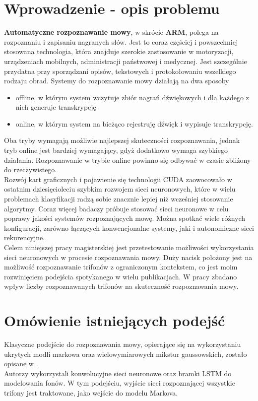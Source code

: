 \documentclass[11pt]{article}
\begin{document}
\section{Wprowadzenie - opis problemu}
	\textbf{Automatyczne rozpoznawanie mowy}, w skrócie \textbf{ARM}, polega na rozpoznaniu i zapisaniu nagranych słów. Jest to coraz częściej i powszechniej stosowana technologia, która znajduje szerokie zastosowanie w motoryzacji, urządzeniach mobilnych, administracji państwowej i medycznej. Jest szczególnie przydatna przy sporządzani opisów, tekstowych i protokołowaniu wszelkiego rodzaju obrad. Systemy do rozpoznawanie mowy działają na dwa sposoby
	\begin{itemize}
		\item offline, w którym system wczytuje zbiór nagrań dźwiękowych i dla każdego z nich generuje transkrypcję
		\item online, w którym system na bieżąco rejestruję dźwięk i wypisuje transkrypcję.
	\end{itemize}
	Oba tryby wymagają możliwie najlepszej skuteczności rozpoznawania, jednak tryb online jest bardziej wymagający, gdyż dodatkowo wymaga szybkiego działania. Rozpoznawanie w trybie online powinno się odbywać w czasie zbliżony do rzeczywistego. 
	\\
	Rozwój kart graficznych i pojawienie się technologii CUDA zaowocowało w ostatnim dziesięcioleciu szybkim rozwojem sieci neuronowych, które w wielu problemach klasyfikacji radzą sobie znacznie lepiej niż wcześniej stosowanie algorytmy. Coraz więcej badaczy próbuje stosować sieci neuronowe w celu poprawy jakości systemów rozpoznających mowę. Można spotkać wiele różnych konfiguracji, zarówno łączących konwencjonalne systemy, jaki i autonomiczne sieci rekurencyjne.
	\\
	Celem niniejszej pracy magisterskiej jest przetestowanie możliwości wykorzystania sieci neuronowych w procesie rozpoznawania mowy. Duży nacisk położony jest na możliwość rozpoznawanie trifonów z ograniczonym kontekstem, co jest moim rozwinięciem podejścia spotykanego w wielu publikacjach. W pracy zbadano wpływ liczby rozpoznawanych trifonów na skuteczność rozpoznawania mowy.
	
\section{Omówienie istniejących podejść}
	Klasyczne podejście do rozpoznawania mowy, opierające się na wykorzystaniu ukrytych modli markowa oraz wielowymiarowych mikstur gaussowskich, zostało opisane w \cite{book1}. 
	\\
	Autorzy \cite{article1} wykorzystali konwolucyjne sieci neuronowe oraz bramki LSTM do modelowania fonów. W tym podejściu, wyjście sieci rozpoznającej wszystkie trifony jest traktowane, jako wejście do modelu Markova. 
	
\end{document}
